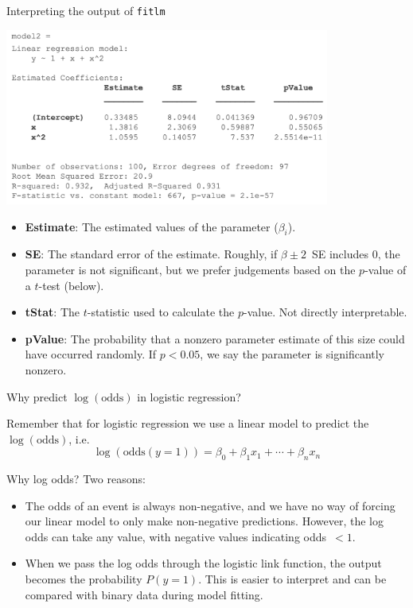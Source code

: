 \documentclass[9pt]{beamer}
\begin{document}
\begin{frame}{Interpreting the output of \texttt{fitlm}}

\begin{center}
	\includegraphics[width=0.8\textwidth]{fitlm-output}
\end{center}
{\small
\begin{itemize}
	\item \textbf{Estimate}: The estimated values of the parameter ($\beta_i$).
	\item \textbf{SE}: The standard error of the estimate. Roughly, if $\beta\pm 2$~SE includes 0, the parameter is not significant, but we prefer judgements based on the $p$-value of a $t$-test (below).
	\item \textbf{tStat}: The $t$-statistic used to calculate the $p$-value. Not directly interpretable.
	\item \textbf{pValue}: The probability that a nonzero parameter estimate of this size could have occurred randomly. If $p < 0.05$, we say the parameter is significantly nonzero.
\end{itemize}
}
\end{frame}

\begin{frame}{Why predict $\log(\mathrm{odds})$ in logistic regression?}

Remember that for logistic regression we use a linear model to predict the $\log(\mathrm{odds})$, i.e.\
\[ \log(\mathrm{odds}(y=1)) = \beta_0 + \beta_1x_1 + \cdots + \beta_nx_n \]

\pause
Why log odds? Two reasons:
\begin{itemize}
	\item The odds of an event is always non-negative, and we have no way of forcing our linear model to only make non-negative predictions. However, the log odds can take any value, with negative values indicating odds~$<1$.
	\item When we pass the log odds through the logistic link function, the output becomes the probability $P(y=1)$. This is easier to interpret and can be compared with binary data during model fitting.
\end{itemize}

\end{frame}
\end{document}
